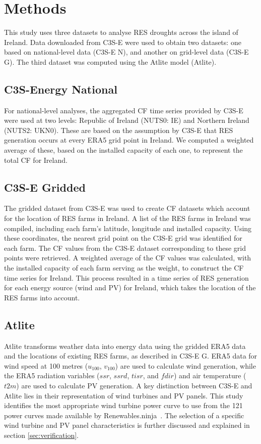 \documentclass[preprint, 12pt]{elsarticle}
\begin{document}
\section{Methods}
\label{sec:methods}

This study uses three datasets to analyse RES droughts across the island of Ireland. Data downloaded from C3S-E were used to obtain two datasets: one based on national-level data (C3S-E N), and another on grid-level data (C3S-E G). The third dataset was computed using the Atlite model (Atlite).

\subsection{C3S-Energy National}
\label{sec:c3se_n}

For national-level analyses, the aggregated CF time series provided by C3S-E were used at two levels: Republic of Ireland (NUTS0: IE) and Northern Ireland (NUTS2: UKN0). These are based on the assumption by C3S-E that RES generation occurs at every ERA5 grid point in Ireland. We computed a weighted average of these, based on the installed capacity of each one, to represent the total CF for Ireland.

\subsection{C3S-E Gridded}
\label{sec:c3se_g}

The gridded dataset from C3S-E was used to create CF datasets which account for the location of RES farms in Ireland. A list of the RES farms in Ireland was compiled, including each farm’s latitude, longitude and installed capacity. Using these coordinates, the nearest grid point on the C3S-E grid was identified for each farm. The CF values from the C3S-E dataset corresponding to these grid points were retrieved. A weighted average of the CF values was calculated, with the installed capacity of each farm serving as the weight, to construct the CF time series for Ireland. This process resulted in a time series of RES generation for each energy source (wind and PV) for Ireland, which takes the location of the RES farms into account.

\subsection{Atlite} 
\label{sec:atlite}

Atlite transforms weather data into energy data using the gridded ERA5 data and the locations of existing RES farms, as described in C3S-E G. ERA5 data for wind speed at 100 metres ($u_{100}$, $v_{100}$) are used to calculate wind generation, while the ERA5 radiation variables ($ssr$, $ssrd$, $tisr$, and $fdir$) and air temperature ($t2m$) are used to calculate PV generation. A key distinction between C3S-E and Atlite lies in their representation of wind turbines and PV panels. This study identifies the most appropriate wind turbine power curve to use from the 121 power curves made available by Renewables.ninja~\citep{staffell2016wake}. The selection of a specific wind turbine and PV panel characteristics is further discussed and explained in section \ref{sec:verification}.
\end{document}
